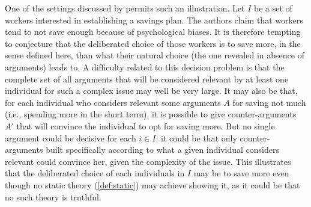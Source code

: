 \documentclass[version=last, pagesize, twoside=off, bibliography=totoc, DIV=calc, fontsize=12pt, a4paper, french, english]{scrartcl}
\begin{document}
  One of the settings discussed by \citet{thaler_nudge_2009} permits such an illustration. %
  Let $I$ be a set of workers interested in establishing a savings plan.
  The authors claim that workers tend to not save enough because of psychological biases.
  It is therefore tempting to conjecture that the deliberated choice of those workers is to save more, in the sense defined here, than what their natural choice (the one revealed in absence of arguments) leads to.
  A difficulty related to this decision problem is that the complete set of all arguments that will be considered relevant by at least one individual for such a complex issue may well be very large. It may also be that, for each individual who considers relevant some arguments $A$ for saving not much (i.e., spending more in the short term), it is possible to give counter-arguments $A'$ that will convince the individual to opt for saving more.
  But no single argument could be decisive for each $i \in I$: it could be that only counter-arguments built specifically according to what a given individual considers relevant could convince her, given the complexity of the issue.
  This illustrates that the deliberated choice of each individuals in $I$ may be to save more even though no static theory (\cref{def:static}) may achieve showing it, as it could be that no such theory is truthful.

\end{document}

